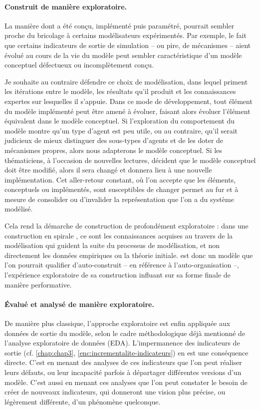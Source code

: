 \paragraph{Construit de manière exploratoire.}

La manière dont \simfeodal{} a été conçu, implémenté puis paramétré, pourrait sembler proche du \og bricolage\fg{} à certains modélisateurs expérimentés.
Par exemple, le fait que certains indicateurs de sortie de simulation -- ou pire, de mécanismes -- aient évolué au cours de la vie du modèle peut sembler caractéristique d'un modèle conceptuel défectueux ou incomplètement conçu.

Je souhaite au contraire défendre ce choix de modélisation, dans lequel priment les itérations entre le modèle, les résultats qu'il produit et les connaissances expertes sur lesquelles il s'appuie.
Dans ce mode de développement, tout élément du modèle implémenté peut être amené à évoluer, faisant alors évoluer l'élément équivalent dans le modèle conceptuel.
Si l'exploration du comportement du modèle montre qu'un type d'agent est peu utile, ou au contraire, qu'il serait judicieux de mieux distinguer des sous-types d'agents et de les doter de mécanismes propres, alors nous adapterons le modèle conceptuel.
Si les thématiciens, à l'occasion de nouvelles lectures, décident que le modèle conceptuel doit être modifié, alors il sera changé et donnera lieu à une nouvelle implémentation.
Cet aller-retour constant, où l'on accepte que les éléments, conceptuels ou implémentés, sont susceptibles de changer permet au fur et à mesure de consolider ou d'invalider la représentation que l'on a du système modélisé.

Cela rend la démarche de construction de \simfeodal{} profondément exploratoire :
dans une construction \og en spirale\fg{} \autocite[157]{mathian_objets_2014}, ce sont les connaissances acquises au travers de la modélisation qui guident la suite du processus de modélisation, et non directement les données empiriques ou la théorie initiale.
\simfeodal{} est donc un modèle que l'on pourrait qualifier d'\og auto-construit\fg{} -- en référence à l'auto-organisation --, l'expérience exploratoire de sa construction influant sur sa forme finale de manière performative.

\paragraph{Évalué et analysé de manière exploratoire.}
De manière plus classique, l'approche exploratoire est enfin appliquée aux données de sortie du modèle, selon le cadre méthodologique déjà mentionné de l'analyse exploratoire de données (EDA).
L'impermanence des indicateurs de sortie (cf. \cref{chap:chap3}, \cref{enc:incrementalite-indicateurs}) en est une conséquence directe.
C'est en menant des analyses de ces indicateurs que l'on peut réaliser leurs défauts, ou leur incapacité parfois à départager différentes versions d'un modèle.
C'est aussi en menant ces analyses que l'on peut constater le besoin de créer de nouveaux indicateurs, qui donneront une vision plus précise, ou légèrement différente, d'un phénomène quelconque.

